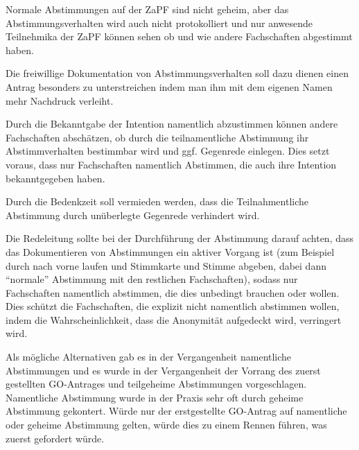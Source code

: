 \documentclass[
  a4paper,
  oneside]{scrartcl}
\begin{document}
Normale Abstimmungen auf der ZaPF sind nicht geheim, aber das
Abstimmungsverhalten wird auch nicht protokolliert und nur anwesende
Teilnehmika der ZaPF können sehen ob und wie andere Fachschaften
abgestimmt haben.

Die freiwillige Dokumentation von Abstimmungsverhalten soll dazu dienen
einen Antrag besonders zu unterstreichen indem man ihm mit dem eigenen
Namen mehr Nachdruck verleiht.

Durch die Bekanntgabe der Intention namentlich abzustimmen können andere
Fachschaften abschätzen, ob durch die teilnamentliche Abstimmung ihr
Abstimmverhalten bestimmbar wird und ggf. Gegenrede einlegen. Dies setzt
voraus, dass nur Fachschaften namentlich Abstimmen, die auch ihre
Intention bekanntgegeben haben.

Durch die Bedenkzeit soll vermieden werden, dass die Teilnahmentliche
Abstimmung durch unüberlegte Gegenrede verhindert wird.

Die Redeleitung sollte bei der Durchführung der Abstimmung darauf
achten, dass das Dokumentieren von Abstimmungen ein aktiver Vorgang ist
(zum Beispiel durch nach vorne laufen und Stimmkarte und Stimme abgeben,
dabei dann ``normale'' Abstimmung mit den restlichen Fachschaften),
sodass nur Fachschaften namentlich abstimmen, die dies unbedingt
brauchen oder wollen. Dies schützt die Fachschaften, die explizit nicht
namentlich abstimmen wollen, indem die Wahrscheinlichkeit, dass die
Anonymität aufgedeckt wird, verringert wird.

Als mögliche Alternativen gab es in der Vergangenheit namentliche
Abstimmungen und es wurde in der Vergangenheit der Vorrang des zuerst
gestellten GO-Antrages und teilgeheime Abstimmungen vorgeschlagen.
Namentliche Abstimmung wurde in der Praxis sehr oft durch geheime
Abstimmung gekontert. Würde nur der erstgestellte GO-Antrag auf
namentliche oder geheime Abstimmung gelten, würde dies zu einem Rennen
führen, was zuerst gefordert würde.
\end{document}
